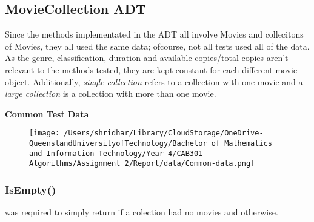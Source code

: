 \documentclass[a4paper]{article}
\begin{document}
\subsection{MovieCollection ADT}
Since the methods implementated in the  ADT all involve Movies and collecitons of Movies, they all used the same data; ofcourse, not all tests used all of the data. As the genre, classification, duration and available copies/total copies aren't relevant to the methods tested, they are kept constant for each different movie object. Additionally, \textit{single collection} refers to a collection with one movie and a \textit{large collection} is a collection with more than one movie.
\vspace{3mm}

\noindent
\textbf{Common Test Data}
\begin{figure}[H]
    \centering
    \texttt{[image: /Users/shridhar/Library/CloudStorage/OneDrive-QueenslandUniversityofTechnology/Bachelor of Mathematics and Information Technology/Year 4/CAB301 Algorithms/Assignment 2/Report/data/Common-data.png]}
\end{figure}

\subsubsection{IsEmpty{()}}
 was required to simply return  if a colection had no movies and  otherwise.
\end{document}
